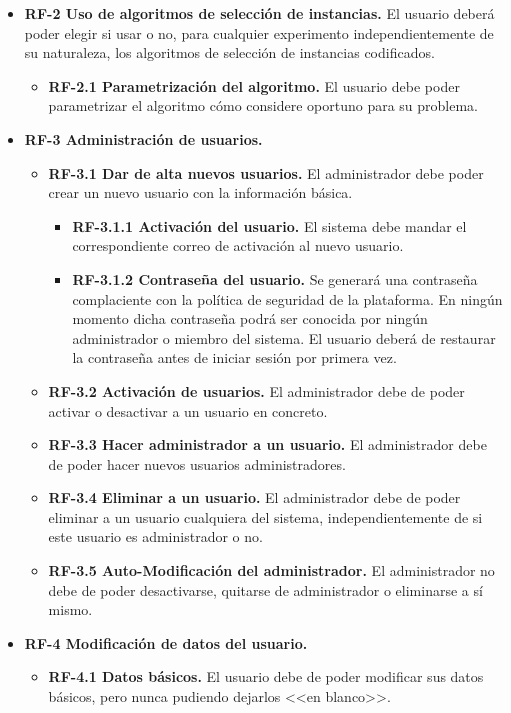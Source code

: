 \begin{itemize}
\item \textbf{RF-2 Uso de algoritmos de selección de instancias.} El usuario deberá poder elegir si usar o no, para cualquier experimento independientemente de su naturaleza, los algoritmos de selección de instancias codificados.
	\begin{itemize}
	\tightlist
	\item \textbf{RF-2.1 Parametrización del algoritmo.} El usuario debe poder parametrizar el algoritmo cómo considere oportuno para su problema.
\end{itemize}
\item \textbf{RF-3 Administración de usuarios.}
	\begin{itemize}
	\tightlist
	\item \textbf{RF-3.1 Dar de alta nuevos usuarios.} El administrador debe poder crear un nuevo usuario con la información básica.
	\begin{itemize}
	\tightlist
	\item \textbf{RF-3.1.1 Activación del usuario.} El sistema debe mandar el correspondiente correo de activación al nuevo usuario.
	\item \textbf{RF-3.1.2 Contraseña del usuario.} Se generará una contraseña complaciente con la política de seguridad de la plataforma. En ningún momento dicha contraseña podrá ser conocida por ningún administrador o miembro del sistema. El usuario deberá de restaurar la contraseña antes de iniciar sesión por primera vez.
	\end{itemize}
	\item \textbf{RF-3.2 Activación de usuarios.} El administrador debe de poder activar o desactivar a un usuario en concreto.
	\item \textbf{RF-3.3 Hacer administrador a un usuario.} El administrador debe de poder hacer nuevos usuarios administradores.
	\item \textbf{RF-3.4 Eliminar a un usuario.} El administrador debe de poder eliminar a un usuario cualquiera del sistema, independientemente de si este usuario es administrador o no.
	\item \textbf{RF-3.5 Auto-Modificación del administrador.} El administrador no debe de poder desactivarse, quitarse de administrador o eliminarse a sí mismo.
	\end{itemize}
\item \textbf{RF-4 Modificación de datos del usuario.}
	\begin{itemize}
	\tightlist
	\item \textbf{RF-4.1 Datos básicos.} El usuario debe de poder modificar sus datos básicos, pero nunca pudiendo dejarlos <<en blanco>>.

\end{itemize}
\end{itemize}
